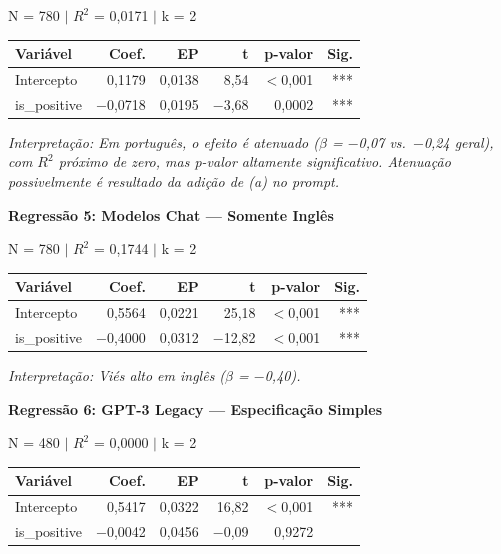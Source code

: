 \documentclass[12pt,a4paper]{article}
\begin{document}
\noindent N = 780 $|$ $R^2$ = 0,0171 $|$ k = 2

\begin{table}[H]
\centering
\begin{tabular}{lrrrrr}
\toprule
\textbf{Variável} & \textbf{Coef.} & \textbf{EP} & \textbf{t} & \textbf{p-valor} & \textbf{Sig.} \\
\midrule
Intercepto & 0,1179 & 0,0138 & 8,54 & $<$0,001 & *** \\
is\_positive & $-$0,0718 & 0,0195 & $-$3,68 & 0,0002 & *** \\
\bottomrule
\end{tabular}
\end{table}

\noindent\textit{Interpretação: Em português, o efeito é atenuado ($\beta$ = $-$0,07 vs.\ $-$0,24
geral), com $R^2$ próximo de zero, mas p-valor altamente significativo.
Atenuação possivelmente é resultado da adição de (a) no prompt.}

\vspace{0.5cm}
\noindent\textbf{Regressão 5: Modelos Chat --- Somente Inglês}

\noindent N = 780 $|$ $R^2$ = 0,1744 $|$ k = 2

\begin{table}[H]
\centering
\begin{tabular}{lrrrrr}
\toprule
\textbf{Variável} & \textbf{Coef.} & \textbf{EP} & \textbf{t} & \textbf{p-valor} & \textbf{Sig.} \\
\midrule
Intercepto & 0,5564 & 0,0221 & 25,18 & $<$0,001 & *** \\
is\_positive & $-$0,4000 & 0,0312 & $-$12,82 & $<$0,001 & *** \\
\bottomrule
\end{tabular}
\end{table}

\noindent\textit{Interpretação: Viés alto em inglês ($\beta$ = $-$0,40).}

\vspace{0.5cm}
\noindent\textbf{Regressão 6: GPT-3 Legacy --- Especificação Simples}

\noindent N = 480 $|$ $R^2$ = 0,0000 $|$ k = 2

\begin{table}[H]
\centering
\begin{tabular}{lrrrrr}
\toprule
\textbf{Variável} & \textbf{Coef.} & \textbf{EP} & \textbf{t} & \textbf{p-valor} & \textbf{Sig.} \\
\midrule
Intercepto & 0,5417 & 0,0322 & 16,82 & $<$0,001 & *** \\
is\_positive & $-$0,0042 & 0,0456 & $-$0,09 & 0,9272 & \\
\bottomrule
\end{tabular}
\end{table}
\end{document}
